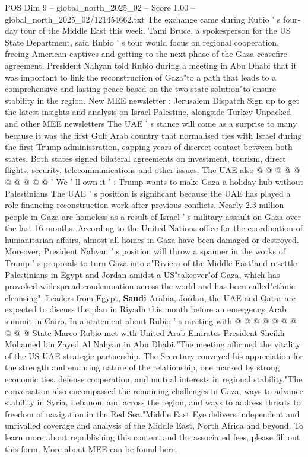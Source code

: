 \begin{textsample}{POS Dim 9 – global\_north\_2025\_02 – Score 1.00 – global\_north\_2025\_02/121454662.txt}  \label{ex:f9_pos_393}
The exchange came during Rubio ' s four-day tour of the Middle East this week.
Tami Bruce, a spokesperson for the US State Department, said Rubio ' s tour would focus on regional cooperation, freeing American captives and getting to the next phase of the Gaza ceasefire agreement.
President Nahyan told Rubio during a meeting in Abu Dhabi that it was important to link the reconstruction of Gaza"to a path that leads to a comprehensive and lasting peace based on the two-state solution"to ensure stability in the region.
New MEE newsletter : Jerusalem Dispatch Sign up to get the latest insights and analysis on Israel-Palestine, alongside Turkey Unpacked and other MEE newsletters The UAE ' s stance will come as a surprise to many because it was the first Gulf Arab country that normalised ties with Israel during the first Trump administration, capping years of discreet contact between both states.
Both states signed bilateral agreements on investment, tourism, direct flights, security, telecommunications and other issues.
The UAE also @ @ @ @ @ @ @ @ @ @ ' We ' ll own it ' : Trump wants to make Gaza a holiday hub without Palestinians The UAE ' s position is significant because the UAE has played a role financing reconstruction work after previous conflicts.
Nearly 2.3 million people in Gaza are homeless as a result of Israel ' s military assault on Gaza over the last 16 months.
According to the United Nations office for the coordination of humanitarian affairs, almost all homes in Gaza have been damaged or destroyed.
Moreover, President Nahyan ' s position will throw a spanner in the works of Trump ' s proposals to turn Gaza into a"Riviera of the Middle East"and resettle Palestinians in Egypt and Jordan amidst a US"takeover"of Gaza, which has provoked widespread condemnation across the world and has been called"ethnic cleansing".
Leaders from Egypt, \textbf{Saudi} Arabia, Jordan, the UAE and Qatar are expected to discuss the plan in Riyadh this month before an emergency Arab summit in Cairo.
In a statement about Rubio ' s meeting with @ @ @ @ @ @ @ @ @ @ State Marco Rubio met with United Arab Emirates President Sheikh Mohamed bin Zayed Al Nahyan in Abu Dhabi."The meeting affirmed the vitality of the US-UAE strategic partnership.
The Secretary conveyed his appreciation for the strength and enduring nature of the relationship, one marked by strong economic ties, defense cooperation, and mutual interests in regional stability."The conversation also encompassed the remaining challenges in Gaza, ways to advance stability in Syria, Lebanon, and across the region, and ways to address threats to freedom of navigation in the Red Sea."Middle East Eye delivers independent and unrivalled coverage and analysis of the Middle East, North Africa and beyond.
To learn more about republishing this content and the associated fees, please fill out this form.
More about MEE can be found here.

\end{textsample}
